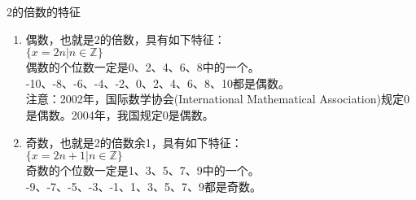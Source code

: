 \documentclass[aspectratio=169]{ctexbeamer} %
\date{\today}
\begin{document}
\begin{frame}[t]{2的倍数的特征}
\begin{spacing}{1.2}
\normalsize

\begin{enumerate}[label={\arabic*.}]
\item 偶数，也就是2的倍数，具有如下特征：\\
$\{x = 2n | n \in \mathbb Z\}$ \\
偶数的个位数一定是0、2、4、6、8中的一个。\\
-10、-8、-6、-4、-2、0、2、4、6、8、10都是偶数。 \\
\alert{注意：2002年，国际数学协会(International Mathematical Association)规定0是偶数。2004年，我国规定0是偶数。}
\item 奇数，也就是2的倍数余1，具有如下特征：\\
$\{x = 2n+1 | n \in \mathbb Z\}$ \\
奇数的个位数一定是1、3、5、7、9中的一个。\\
-9、-7、-5、-3、-1、1、3、5、7、9都是奇数。 \\
\end{enumerate}

\end{spacing}
\end{frame}
\end{document}
